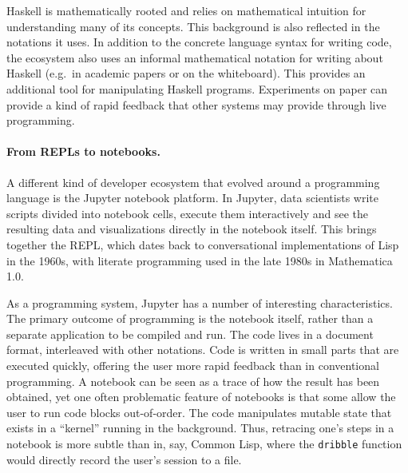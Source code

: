 \documentclass[english,submission]{programming}
\providecommand{\DIFadd}[1]{{\protect\color{blue}\uwave{#1}}} %
\providecommand{\DIFaddbegin}{} %
\providecommand{\DIFaddend}{} %
\begin{document}
Haskell is mathematically rooted and relies on mathematical intuition
for understanding many of its concepts. This background is also
reflected in the notations it uses. In addition to the concrete language
syntax for writing code, the ecosystem also uses an informal
mathematical notation for writing about Haskell (e.g.~in academic papers
or on the whiteboard). This provides an additional tool for manipulating
Haskell programs. Experiments on paper can provide a kind of rapid
feedback that other systems may provide through live programming.

\paragraph{From REPLs to notebooks.}

A different kind of developer ecosystem that evolved around a
programming language is the Jupyter notebook platform\DIFaddbegin \DIFadd{~\mbox{%
\cite{Jupyter}}\hspace{0pt}%
}\DIFaddend . In
Jupyter, data scientists write scripts divided into notebook cells,
execute them interactively and see the resulting data and visualizations
directly in the notebook itself. This brings together the REPL, which
dates back to conversational implementations of Lisp in the 1960s, with
literate programming\DIFaddbegin \DIFadd{~}\DIFaddend \cite{LiterateProg} used in the late 1980s in
Mathematica 1.0\DIFaddbegin \DIFadd{~\mbox{%
\cite{Mathematica}}\hspace{0pt}%
}\DIFaddend .

As a programming system, Jupyter has a number of interesting
characteristics. The primary outcome of programming is the notebook
itself, rather than a separate application to be compiled and run. The
code lives in a document format, interleaved with other notations. Code
is written in small parts that are executed quickly, offering the user
more rapid feedback than in conventional programming. A notebook can be
seen as a trace of how the result has been obtained, yet one often
problematic feature of notebooks is that some allow the user to run code
blocks out-of-order. The code manipulates mutable state that exists in a
``kernel'' running in the background. Thus, retracing one's steps in a
notebook is more subtle than in, say, Common Lisp\DIFaddbegin \DIFadd{~\mbox{%
\cite{CommonLisp}}\hspace{0pt}%
}\DIFaddend ,
where the \texttt{dribble} function would directly record the user's
session to a file.
\end{document}
